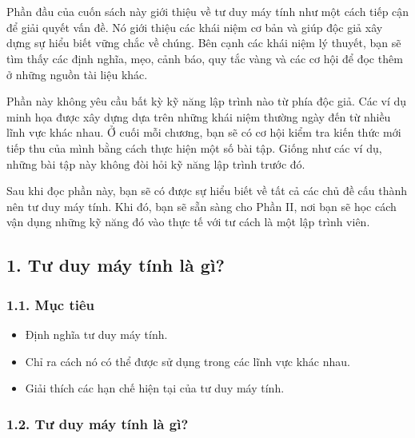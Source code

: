 \newpage
\chapter*{}

\noindent \indent Phần đầu của cuốn sách này giới thiệu về tư duy máy tính như một cách tiếp cận để giải quyết vấn đề. Nó giới thiệu các khái niệm cơ bản và giúp độc giả xây dựng sự hiểu biết vững chắc về chúng. Bên cạnh các khái niệm lý thuyết, bạn sẽ tìm thấy các định nghĩa, mẹo, cảnh báo, quy tắc vàng và các cơ hội để đọc thêm ở những nguồn tài liệu khác.

Phần này không yêu cầu bất kỳ kỹ năng lập trình nào từ phía độc giả. Các ví dụ minh họa được xây dựng dựa trên những khái niệm thường ngày đến từ nhiều lĩnh vực khác nhau. Ở cuối mỗi chương, bạn sẽ có cơ hội kiểm tra kiến thức mới tiếp thu của mình bằng cách thực hiện một số bài tập. Giống như các ví dụ, những bài tập này không đòi hỏi kỹ năng lập trình trước đó.

Sau khi đọc phần này, bạn sẽ có được sự hiểu biết về tất cả các chủ đề cấu thành nên tư duy máy tính. Khi đó, bạn sẽ sẵn sàng cho Phần II, nơi bạn sẽ học cách vận dụng những kỹ năng đó vào thực tế với tư cách là một lập trình viên. 

\section*{1. Tư duy máy tính là gì?}

\subsection*{1.1. Mục tiêu}
\begin{itemize}
    \item Định nghĩa tư duy máy tính.
    \item Chỉ ra cách nó có thể được sử dụng trong các lĩnh vực khác nhau.
    \item Giải thích các hạn chế hiện tại của tư duy máy tính.
\end{itemize}

\subsection*{1.2. Tư duy máy tính là gì?}


